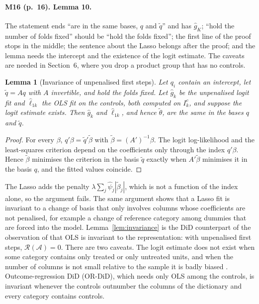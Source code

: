 \documentclass[11pt]{article}
\newenvironment{ins}{\begin{leftbar}}{\end{leftbar}}
\theoremstyle{plain}
\newtheorem{lemma}{Lemma}
\theoremstyle{remark}
\begin{document}
\paragraph{M16 (p.~16). Lemma 10.}
The statement ends ``are in the same bases, $q$ and $\tilde q$'' and has
$\hat g_K$; ``hold the number of folds fixed'' should be ``hold the folds
fixed''; the first line of the proof stops in the middle; the sentence about the
Lasso belongs after the proof; and the lemma needs the intercept and the
existence of the logit estimate. The caveats are needed in Section~6, where you
drop a product group that has no controls.
\begin{ins}
\begin{lemma}[Invariance of unpenalised first steps] %
Let $q_i$ contain an intercept, let $\tilde q=Aq$ with $A$ invertible, and hold
the folds fixed. Let $\hat g_k$ be the unpenalised logit fit and $\hat\ell_{1k}$
the OLS fit on the controls, both computed on $I_k^c$, and suppose the logit
estimate exists. Then $\hat g_k$ and $\hat\ell_{1k}$, and hence $\tilde\theta$,
are the same in the bases $q$ and $\tilde q$.
\end{lemma}
\begin{proof}
For every $\beta$, $q'\beta=\tilde q'\tilde\beta$ with
$\tilde\beta=(A')^{-1}\beta$. The logit log-likelihood and the least-squares
criterion depend on the coefficients only through the index $q'\beta$. Hence
$\tilde\beta$ minimises the criterion in the basis $\tilde q$ exactly when
$A'\tilde\beta$ minimises it in the basis $q$, and the fitted values coincide.
\end{proof}
The Lasso adds the penalty $\lambda\sum_j\hat\psi_j|\tilde\beta_j|$, which is not
a function of the index alone, so the argument fails. The same argument shows
that a Lasso fit is invariant to a change of basis that only involves columns
whose coefficients are not penalised, for example a change of reference
category among dummies that are forced into the model. Lemma~\ref{lem:invariance}
is the DiD counterpart of the observation of \textcite{kolesar2026fragility} that
OLS is invariant to the representation: with unpenalised first steps,
$\mathcal R(\mathcal A)=0$. There are two caveats. The logit estimate does not
exist when some category contains only treated or only untreated units, and when
the number of columns is not small relative to the sample it is badly biased
\parencite{sur2019modern}. Outcome-regression DiD (OR-DiD), which needs only OLS
among the controls, is invariant whenever the controls outnumber the columns of
the dictionary and every category contains controls.
\end{ins}
\end{document}
